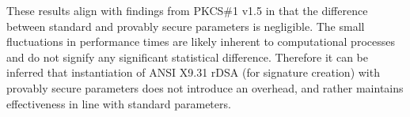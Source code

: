 \documentclass[]{final_report}
\theoremstyle{definition}
\begin{document}
These results align with findings from PKCS\#1 v1.5 in that the difference between standard and provably secure parameters is negligible. The small fluctuations in performance times are likely inherent to computational processes and do not signify any significant statistical difference. Therefore it can be inferred that instantiation of ANSI X9.31 rDSA (for signature creation) with provably secure parameters does not introduce an overhead, and rather maintains effectiveness in line with standard parameters.

\end{document}
